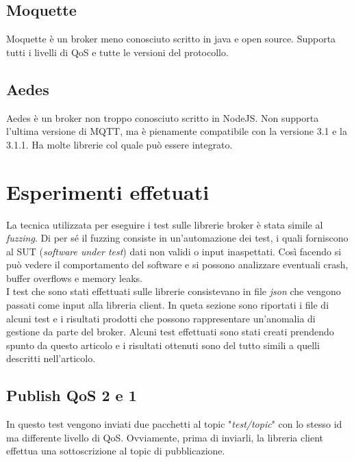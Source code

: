 \documentclass[binding=0.6cm,TFA]{sapthesis}
\begin{document}
\begin{large}
\subsection{Moquette}
Moquette \cite{Moquette} è un broker meno conosciuto scritto in java e open source. Supporta tutti i livelli di QoS e tutte le versioni del protocollo.

\subsection{Aedes}
Aedes \cite{Aedes} è un broker non troppo conosciuto scritto in NodeJS. Non supporta l'ultima versione di MQTT, ma è pienamente compatibile con la versione 3.1 e la 3.1.1. Ha molte librerie col quale può essere integrato.

\section{Esperimenti effetuati}
La tecnica utilizzata per eseguire i test sulle librerie broker è stata simile al \textit{fuzzing}. Di per sé il fuzzing consiste in un'automazione dei test, i quali forniscono al SUT (\textit{software under test}) dati non validi o input inaspettati. Così facendo si può vedere il comportamento del software e si possono analizzare eventuali crash, buffer overflows e memory leaks. \\

I test che sono stati effettuati sulle librerie consistevano in file \textit{json} che vengono passati come input alla libreria client. In queta sezione sono riportati i file di alcuni test e i risultati prodotti che possono rappresentare un'anomalia di gestione da parte del broker.
Alcuni test effettuati sono stati creati prendendo spunto da questo articolo \cite{articleTestsMQTT} e i risultati ottenuti sono del tutto simili a quelli descritti nell'articolo.
\newpage

\subsection{Publish QoS 2 e 1}
\label{chap:publishqos2e1}

\begin{python}
\end{python}
In questo test vengono inviati due pacchetti al topic "\textit{test/topic}" con lo stesso id ma differente livello di QoS. Ovviamente, prima di inviarli, la libreria client effettua una sottoscrizione al topic di pubblicazione. \\


\end{large}
\end{document}
